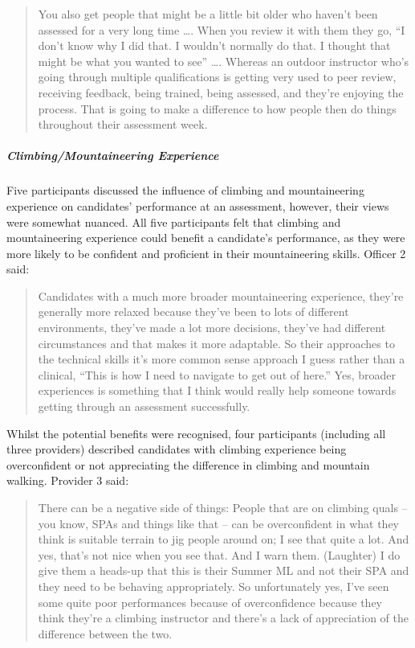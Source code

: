 \documentclass[
  12pt,
  a4paper,
]{book}
\begin{document}
\begin{quote}
You also get people that might be a little bit older who haven't been assessed for a very long time \ldots. When you review it with them they go, ``I don't know why I did that. I wouldn't normally do that. I thought that might be what you wanted to see'' \ldots. Whereas an outdoor instructor who's going through multiple qualifications is getting very used to peer review, receiving feedback, being trained, being assessed, and they're enjoying the process. That is going to make a difference to how people then do things throughout their assessment week.
\end{quote}

\hypertarget{climbingmountaineering-experience}{%
\subparagraph{Climbing/Mountaineering Experience}\label{climbingmountaineering-experience}}

Five participants discussed the influence of climbing and mountaineering experience on candidates' performance at an assessment, however, their views were somewhat nuanced. All five participants felt that climbing and mountaineering experience could benefit a candidate's performance, as they were more likely to be confident and proficient in their mountaineering skills. Officer 2 said:

\begin{quote}
Candidates with a much more broader mountaineering experience, they're generally more relaxed because they've been to lots of different environments, they've made a lot more decisions, they've had different circumstances and that makes it more adaptable. So their approaches to the technical skills it's more common sense approach I guess rather than a clinical, ``This is how I need to navigate to get out of here.'' Yes, broader experiences is something that I think would really help someone towards getting through an assessment successfully.
\end{quote}

Whilst the potential benefits were recognised, four participants (including all three providers) described candidates with climbing experience being overconfident or not appreciating the difference in climbing and mountain walking. Provider 3 said:

\begin{quote}
There can be a negative side of things: People that are on climbing quals -- you know, SPAs and things like that -- can be overconfident in what they think is suitable terrain to jig people around on; I see that quite a lot. And yes, that's not nice when you see that. And I warn them. (Laughter) I do give them a heads-up that this is their Summer ML and not their SPA and they need to be behaving appropriately. So unfortunately yes, I've seen some quite poor performances because of overconfidence because they think they're a climbing instructor and there's a lack of appreciation of the difference between the two.
\end{quote}
\end{document}

